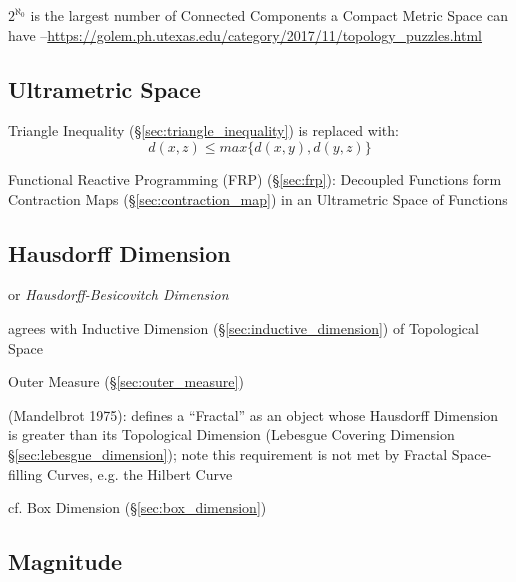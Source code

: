 $2^{\aleph_0}$ is the largest number of Connected Components a Compact Metric
Space can have
--\url{https://golem.ph.utexas.edu/category/2017/11/topology_puzzles.html}



\subsection{Ultrametric Space}\label{sec:ultrametric_space}

Triangle Inequality (\S\ref{sec:triangle_inequality}) is replaced
with:
\[
  d(x,z) \leq max\{d(x,y),d(y,z)\}
\]

Functional Reactive Programming (FRP) (\S\ref{sec:frp}): Decoupled
Functions form Contraction Maps (\S\ref{sec:contraction_map}) in an
Ultrametric Space of Functions



\subsection{Hausdorff Dimension}\label{sec:hausdorff_dimension}

or \emph{Hausdorff-Besicovitch Dimension}

agrees with Inductive Dimension (\S\ref{sec:inductive_dimension}) of Topological
Space

Outer Measure (\S\ref{sec:outer_measure})

(Mandelbrot 1975): defines a ``Fractal'' as an object whose Hausdorff Dimension
is greater than its Topological Dimension (Lebesgue Covering Dimension
\S\ref{sec:lebesgue_dimension}); note this requirement is not met by Fractal
Space-filling Curves, e.g. the Hilbert Curve

cf. Box Dimension (\S\ref{sec:box_dimension})



\subsection{Magnitude}\label{sec:magnitude}

